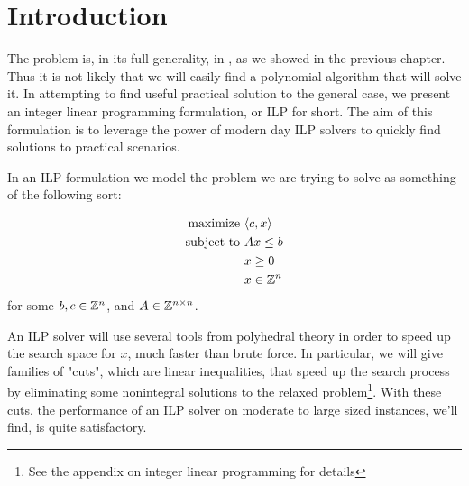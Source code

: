 \section{Introduction}
The problem is, in its full generality, in \npc, as we showed in the previous chapter. Thus it is not likely that we will easily find a polynomial algorithm that will solve it. In attempting to find useful practical solution to the general case, we present an integer linear programming formulation, or ILP for short. The aim of this formulation is to leverage the power of modern day ILP solvers to quickly find solutions to practical scenarios.

In an ILP formulation we model the problem we are trying to solve as something of the following sort:

\begin{alignat*}{2}
\text{maximize } & \langle c, x \rangle\\
\text{subject to } & A x \le b\\
                   & x \ge 0\\
                   & x \in \mathbb{Z}^n
\end{alignat*}
for some $b, c \in \mathbb{Z}^n$, and $A \in \mathbb{Z}^{n \times n}$.

An ILP solver will use several tools from polyhedral theory in order to speed up the search space for $x$, much faster than brute force. In particular, we will give families of "cuts", which are linear inequalities, that speed up the search process by eliminating some nonintegral solutions to the relaxed problem\footnote{See the appendix on integer linear programming for details}. With these cuts, the performance of an ILP solver on moderate to large sized instances, we'll find, is quite satisfactory.
